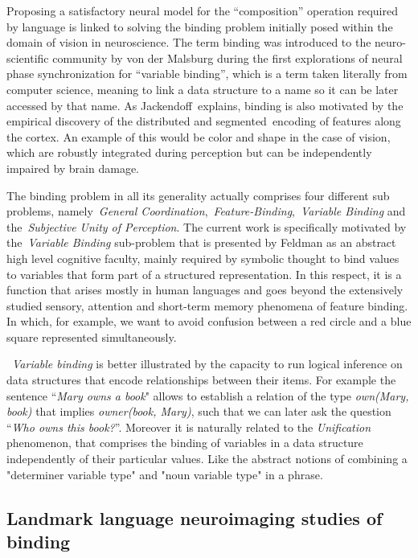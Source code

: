 \documentclass[10pt]{article}
\begin{document}
Proposing a satisfactory neural model for the ``composition'' operation required by language is linked to solving the binding problem initially posed within the domain of vision in neuroscience.
The term binding was introduced to the neuro-scientific community by von der Malsburg\cite{von_der_Malsburg_1994} during the first explorations of neural phase synchronization for ``variable binding'', which is a term taken literally from computer science, meaning to link a data structure to a name so it can be later accessed by that name.
As Jackendoff\cite{Jackendoff_2002b}~explains, binding is also motivated by the empirical discovery of the distributed and segmented~encoding of features along the cortex.
An example of this would be color and shape in the case of vision, which are robustly integrated during perception but can be independently impaired by brain damage.

The binding problem in all its generality actually comprises four different sub problems, namely~\emph{General Coordination},~\emph{Feature-Binding},~\emph{Variable Binding} and the~\emph{Subjective Unity of Perception}\cite{Feldman_2012}.
The current work is specifically motivated by the~\emph{Variable Binding} sub-problem that is presented by Feldman as an abstract high level cognitive faculty, mainly required by symbolic thought to bind values to variables that form part of a structured representation.
In this respect, it is a function that arises mostly in human languages and goes beyond the extensively studied sensory, attention and short-term memory phenomena of feature binding.
In which, for example, we want to avoid confusion between a red circle and a blue square represented simultaneously.

~\emph{Variable binding} is better illustrated by the capacity to run logical inference on data structures that encode relationships between their items.
For example the sentence ``\emph{Mary owns a book}" allows to establish a relation of the type \emph{own(Mary, book)} that implies \emph{owner(book, Mary)}, such that we can later ask the question ``\emph{Who owns this book?}''.
Moreover it is naturally related to the \emph{Unification} phenomenon, that comprises the binding of variables in a data structure independently of their particular values.
Like the abstract notions of combining a "determiner variable type" and "noun variable type" in a phrase.


\subsection{Landmark language neuroimaging studies of binding}
\end{document}
